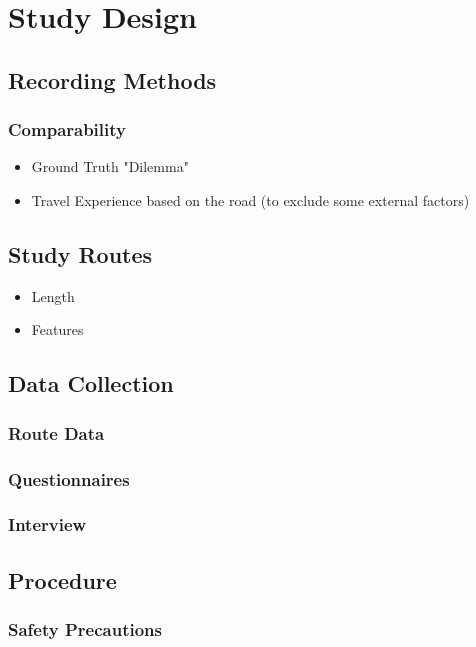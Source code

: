 \section{Study Design}\label{sec:study_design}

\subsection{Recording Methods}

\subsubsection{Comparability}

\begin{itemize}
    \item Ground Truth "Dilemma"
    \item Travel Experience based on the road (to exclude some external factors)
\end{itemize}

\subsection{Study Routes}

\begin{itemize}
    \item Length
    \item Features
\end{itemize}

\subsection{Data Collection}

\subsubsection{Route Data}

\subsubsection{Questionnaires}

\subsubsection{Interview}

\subsection{Procedure}

\subsubsection{Safety Precautions}
